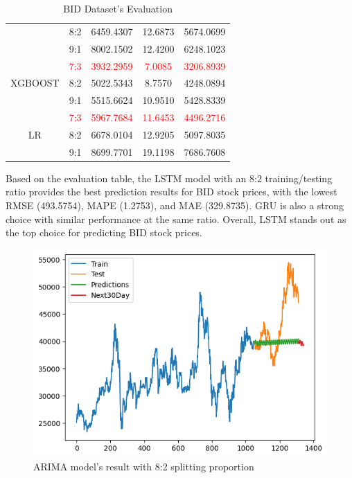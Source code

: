 \documentclass{ieeeojies}
\begin{document}
\begin{table}[H]
\begin{tabular}{|c|c|c|c|c|}
         & 8:2 & 6459.4307 & 12.6873 & 5674.0699 \\ 
         & 9:1 & 8002.1502 & 12.4200 & 6248.1023 \\
         \hline
         \multirow{3}{*}{XGBOOST} 
         & \textcolor{red}{7:3}  & \textcolor{red}{3932.2959} & \textcolor{red}{7.0085} & \textcolor{red}{3206.8939} \\ 
         & 8:2 & 5022.5343 & 8.7570 & 4248.0894 \\ 
         & 9:1 & 5515.6624 & 10.9510 & 5428.8339 \\
         \hline
         \multirow{3}{*}{LR} 
         & \textcolor{red}{7:3} & \textcolor{red}{5967.7684} & \textcolor{red}{11.6453} & \textcolor{red}{4496.2716} \\
         & 8:2 & 6678.0104 & 12.9205 & 5097.8035 \\ 
         & 9:1 & 8699.7701 & 19.1198 & 7686.7608 \\
         \hline
    \end{tabular}
    \caption{BID Dataset's Evaluation}
    \label{vcbdataset}
\end{table}

Based on the evaluation table, the LSTM model with an 8:2 training/testing ratio provides the best prediction results for BID stock prices, with the lowest RMSE (493.5754), MAPE (1.2753), and MAE (329.8735). GRU is also a strong choice with similar performance at the same ratio. Overall, LSTM stands out as the top choice for predicting BID stock prices.

\begin{figure}[H]
  \centering
  \begin{minipage}{0.6\linewidth}
    \centering
    \includegraphics[width=\linewidth]{bibliography/diagram/ARIMA-BID.png}
    \caption{ARIMA model’s result with 8:2 splitting proportion}
    \label{fig8}
  \end{minipage}
\end{figure}
\end{document}
